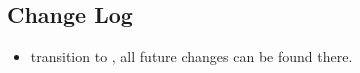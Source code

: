 \clearpage
{}
\begin{center}
\section*{Change Log}
\end{center}

\begin{footnotesize}
\begin{itemize}


\item[2026-08-01] transition to , all future changes can be found there.


\end{itemize}
\end{footnotesize}
